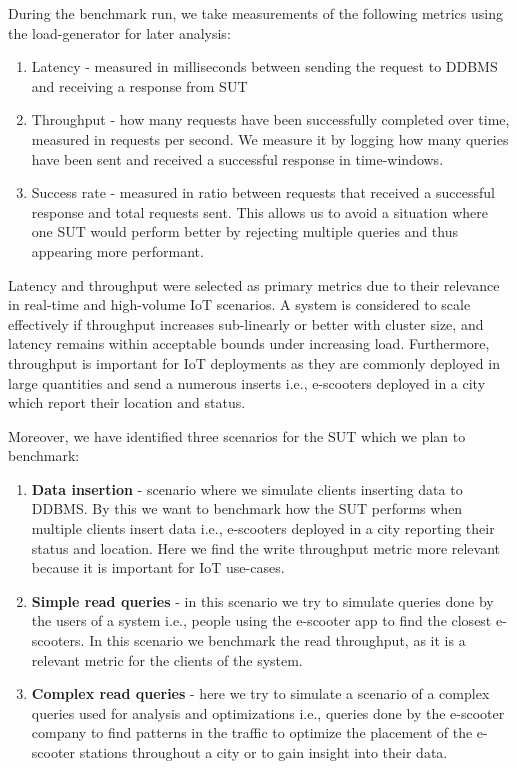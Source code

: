 During the benchmark run, we take measurements of the following metrics using the load-generator for later analysis:
\begin{enumerate}
  \item Latency - measured in milliseconds between sending the request to DDBMS and receiving a response from SUT
  \item Throughput - how many requests have been successfully completed over time, measured in requests per second.
    We measure it by logging how many queries have been sent and received a successful response in time-windows.
  \item Success rate - measured in ratio between requests that received a successful response and total requests sent.
    This allows us to avoid a situation where one SUT would perform better by rejecting multiple queries and thus appearing more performant.
\end{enumerate}

Latency and throughput were selected as primary metrics due to their relevance in real-time and high-volume IoT scenarios.
A system is considered to scale effectively if throughput increases sub-linearly or better with cluster size, and latency remains within acceptable bounds under increasing load.\cite{hossfeldComparingScalabilityCommunication2023}
Furthermore, throughput is important for IoT deployments as they are commonly deployed in large quantities and send a numerous inserts i.e., e-scooters deployed in a city which report their location and status.

Moreover, we have identified three scenarios for the SUT which we plan to benchmark:
\begin{enumerate}
  \item \textbf{Data insertion} - scenario where we simulate clients inserting data to DDBMS.
    By this we want to benchmark how the SUT performs when multiple clients insert data i.e., e-scooters deployed in a city reporting their status and location.
    Here we find the write throughput metric more relevant because it is important for IoT use-cases.
  \item \textbf{Simple read queries} - in this scenario we try to simulate queries done by the users of a system i.e., people using the e-scooter app to find the closest e-scooters.
    In this scenario we benchmark the read throughput, as it is a relevant metric for the clients of the system.
  \item \textbf{Complex read queries} - here we try to simulate a scenario of a complex queries used for analysis and optimizations i.e., queries done by the e-scooter company to find patterns in the traffic to optimize the placement of the e-scooter stations throughout a city or to gain insight into their data.
\end{enumerate}

